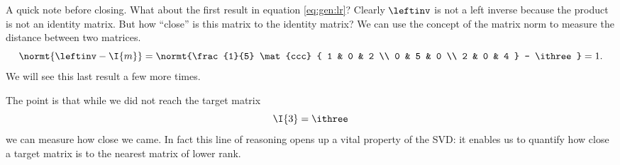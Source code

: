A quick note before closing. What about the first result in equation \eqref{eq:gen:lr}? Clearly $\leftinv$ is not a left inverse because the product is not an identity matrix. But how ``close'' is this matrix to the identity matrix? We can use the concept of the matrix norm to measure the distance between two matrices. 
\begin{equation}
\normt{\leftinv-\I{m}} = 
\normt{\frac{1}{5}
  \mat{ccc}
  {
 1 & 0 & 2 \\
 0 & 5 & 0 \\
 2 & 0 & 4
  }
  -
  \ithree} = 1.
\end{equation}
We will see this last result a few more times.

The point is that while we did not reach the target matrix 
\begin{equation}
  \I{3} = \ithree
\end{equation}
we can measure how close we came. In fact this line of reasoning opens up a vital property of the SVD: it enables us to quantify how close a target matrix is to the nearest matrix of lower rank.


\endinput
